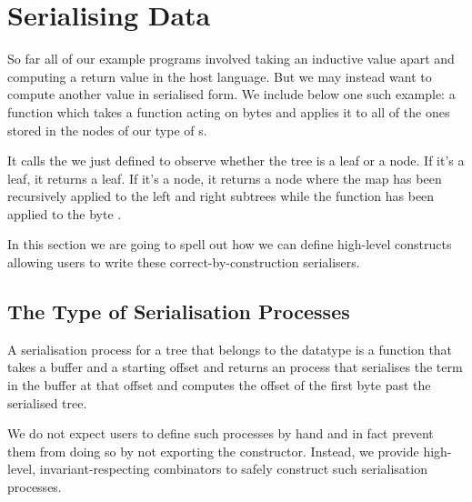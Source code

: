 \section{Serialising Data}\label{sec:serialising}

So far all of our example programs involved taking an inductive value
apart and computing a return value in the host language.
%
But we may instead want to compute another value in serialised form.
%
We include below one such example: a  function which
takes a function  acting on bytes
and applies it to all of the ones stored
in the nodes of our type of s.

\label{fig:serialised-map}

It calls the  we just defined to observe whether
the tree is a leaf or a node.
If it's a leaf, it returns a leaf.
If it's a node, it returns a node where the map has been recursively applied
to the left and right subtrees while the function  has been applied
to the byte .


In this section we are going to spell out how we can define high-level
constructs allowing users to write these correct-by-construction
serialisers.

\subsection{The Type of Serialisation Processes}

A serialisation process for a tree  that belongs to the
datatype  is a function that takes a buffer
and a starting offset and returns an  process that
serialises the term in the buffer at that offset and computes the
offset of the first byte past the serialised tree.


We do not expect users to define such processes by hand and in fact
prevent them from doing so by not exporting the 
constructor.
%
Instead, we provide high-level, invariant-respecting combinators to safely
construct such serialisation processes.

